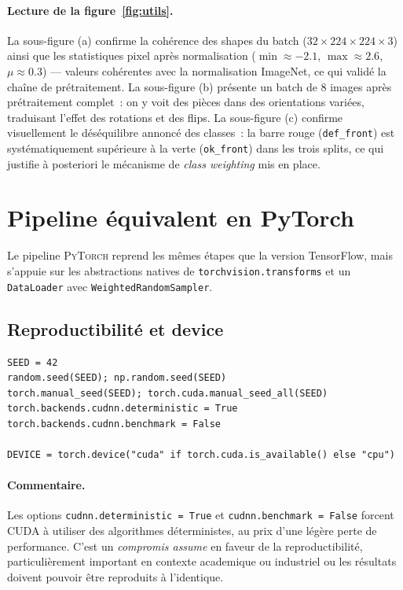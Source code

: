 \documentclass[12pt,a4paper,openany]{report}
\begin{document}
\paragraph{Lecture de la figure~\ref{fig:utils}.}
La sous-figure (a) confirme la cohérence des shapes du batch ($32 \times 224 \times 224 \times 3$) ainsi que les statistiques pixel après normalisation ($\min \approx -2.1$, $\max \approx 2.6$, $\mu \approx 0.3$) --- valeurs cohérentes avec la normalisation ImageNet, ce qui validé la chaîne de prétraitement. La sous-figure (b) présente un batch de 8 images après prétraitement complet~: on y voit des pièces dans des orientations variées, traduisant l'effet des rotations et des flips. La sous-figure (c) confirme visuellement le déséquilibre annoncé des classes~: la barre rouge (\texttt{def\_front}) est systématiquement supérieure à la verte (\texttt{ok\_front}) dans les trois splits, ce qui justifie à posteriori le mécanisme de \emph{class weighting} mis en place.

\section{Pipeline équivalent en PyTorch}

Le pipeline \textsc{PyTorch} reprend les mêmes étapes que la version TensorFlow, mais s'appuie sur les abstractions natives de \texttt{torchvision.transforms} et un \texttt{DataLoader} avec \texttt{WeightedRandomSampler}.

\subsection{Reproductibilité et device}

\begin{lstlisting}[caption={Reproductibilité et détection automatique du device en PyTorch.}]
SEED = 42
random.seed(SEED); np.random.seed(SEED)
torch.manual_seed(SEED); torch.cuda.manual_seed_all(SEED)
torch.backends.cudnn.deterministic = True
torch.backends.cudnn.benchmark = False

DEVICE = torch.device("cuda" if torch.cuda.is_available() else "cpu")
\end{lstlisting}

\paragraph{Commentaire.}
Les options \texttt{cudnn.deterministic = True} et \texttt{cudnn.benchmark = False} forcent CUDA à utiliser des algorithmes déterministes, au prix d'une légère perte de performance. C'est un \emph{compromis assume} en faveur de la reproductibilité, particulièrement important en contexte academique ou industriel ou les résultats doivent pouvoir être reproduits à l'identique.
\end{document}
